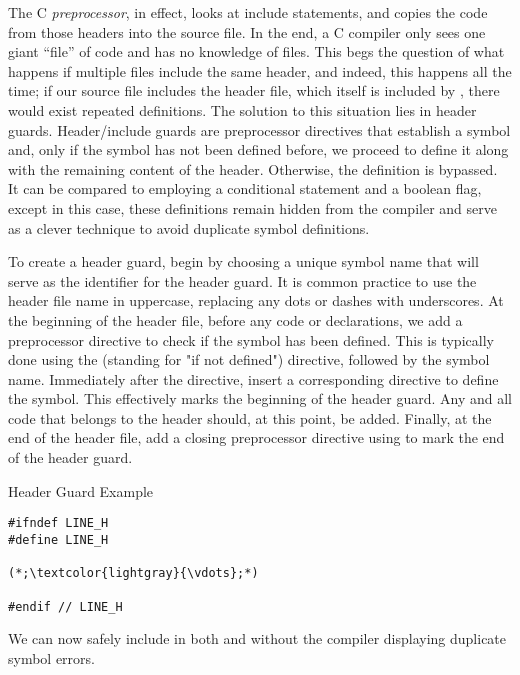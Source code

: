 The C \textit{preprocessor}, in effect, looks at include statements, and copies the code from those headers into the source file. In the end, a C compiler only sees one giant ``file'' of code and has no knowledge of files. This begs the question of what happens if multiple files include the same header, and indeed, this happens all the time; if our  source file includes the  header file, which itself is included by , there would exist repeated definitions. The solution to this situation lies in header guards. Header/include guards are preprocessor directives that establish a symbol and, only if the symbol has not been defined before, we proceed to define it along with the remaining content of the header. Otherwise, the definition is bypassed. It can be compared to employing a conditional statement and a boolean flag, except in this case, these definitions remain hidden from the compiler and serve as a clever technique to avoid duplicate symbol definitions.

To create a header guard, begin by choosing a unique symbol name that will serve as the identifier for the header guard. It is common practice to use the header file name in uppercase, replacing any dots or dashes with underscores. At the beginning of the header file, before any code or declarations, we add a preprocessor directive to check if the symbol has been defined. This is typically done using the  (standing for "if not defined") directive, followed by the symbol name. Immediately after the  directive, insert a corresponding  directive to define the symbol. This effectively marks the beginning of the header guard. Any and all code that belongs to the header should, at this point, be added. Finally, at the end of the header file, add a closing preprocessor directive using  to mark the end of the header guard.

\begin{cl}[line.h]{Header Guard Example}
\begin{lstlisting}[language=MyC]
#ifndef LINE_H
#define LINE_H

(*;\textcolor{lightgray}{\vdots};*)

#endif // LINE_H
\end{lstlisting}
\end{cl}

We can now safely include  in both  and  without the compiler displaying duplicate symbol errors.


